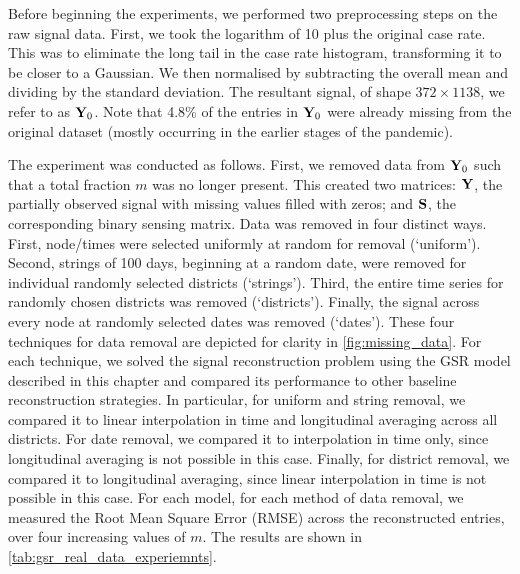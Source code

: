 Before beginning the experiments, we performed two preprocessing steps on the raw signal data. First, we took the logarithm of 10 plus the original case rate. This was to eliminate the long tail in the case rate histogram, transforming it to be closer to a Gaussian. We then normalised by subtracting the overall mean and dividing by the standard deviation. The resultant signal, of shape $372 \times 1138$, we refer to as $\mathbf{Y}_0$. Note that 4.8\% of the entries in $\mathbf{Y}_0$ were already missing from the original dataset (mostly occurring in the earlier stages of the pandemic).

The experiment was conducted as follows. First, we removed data from $\mathbf{Y}_0$ such that a total fraction $m$ was no longer present. This created two matrices: $\mathbf{Y}$, the partially observed signal with missing values filled with zeros; and $\mathbf{S}$, the corresponding binary sensing matrix. Data was removed in four distinct ways. First, node/times were selected uniformly at random for removal (`uniform'). Second, strings of 100 days, beginning at a random date, were removed for individual randomly selected districts (`strings'). Third, the entire time series for randomly chosen districts was removed (`districts'). Finally, the signal across every node at randomly selected dates was removed (`dates'). These four techniques for data removal are depicted for clarity in \cref{fig:missing_data}. For each technique, we solved the signal reconstruction problem using the GSR model described in this chapter and compared its performance to other baseline reconstruction strategies. In particular, for uniform and string removal, we compared it to linear interpolation in time and longitudinal averaging across all districts. For date removal, we compared it to interpolation in time only, since longitudinal averaging is not possible in this case. Finally, for district removal, we compared it to longitudinal averaging, since linear interpolation in time is not possible in this case. For each model, for each method of data removal, we measured the Root Mean Square Error (RMSE) across the reconstructed entries, over four increasing values of $m$. The results are shown in \cref{tab:gsr_real_data_experiemnts}. 



